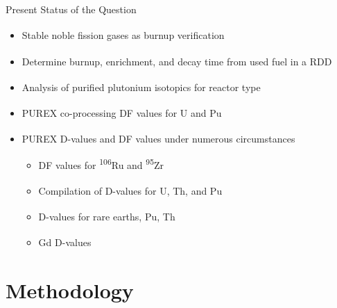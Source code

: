 \documentclass{beamer}
\newcommand{\tss}{\textsuperscript}
\begin{document}
\begin{frame}{Present Status of the Question}
  \begin{itemize}
  \item{Stable noble fission gases as burnup verification\tss{\cite{RN114}}}
  \item{Determine burnup, enrichment, and decay time from used fuel in a RDD\tss{\cite{RN118}}}
  \item{Analysis of purified plutonium isotopics for reactor type\tss{\cite{RN109}}}
  \item{PUREX co-processing DF values for U and Pu\tss{\cite{RN123}}}
  \item{PUREX D-values and DF values under numerous
    circumstances\tss{\cite{benedict1982nuclear,RN169,RN167,RN168,RN177,stoller1961reactor}}}
    \begin{itemize}
    \item{DF values for \tss{106}Ru and \tss{95}Zr\tss{\cite{stoller1961reactor}}}
    \item{Compilation of D-values for U, Th, and Pu\tss{\cite{RN208}}}
    \item{D-values for rare earths, Pu,
      Th\tss{\cite{RN168,RN181,RN182,RN186,RN179,RN180,RN187,RN185,RN183,RN189}}}
    \item{Gd D-values\tss{\cite{RN189}}}
    \end{itemize}
  \end{itemize}
\end{frame}



\section{Methodology}
\end{document}
